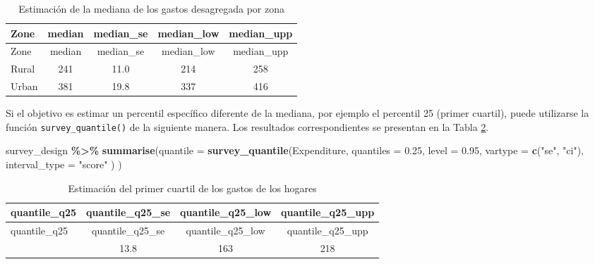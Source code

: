 \documentclass[
  spanish,
  12pt,
]{book}
\newenvironment{Shaded}{\begin{snugshade}}{\end{snugshade}}
\newcommand{\AttributeTok}[1]{\textcolor[rgb]{0.13,0.29,0.53}{#1}}
\newcommand{\FloatTok}[1]{\textcolor[rgb]{0.00,0.00,0.81}{#1}}
\newcommand{\FunctionTok}[1]{\textcolor[rgb]{0.13,0.29,0.53}{\textbf{#1}}}
\newcommand{\NormalTok}[1]{#1}
\newcommand{\SpecialCharTok}[1]{\textcolor[rgb]{0.81,0.36,0.00}{\textbf{#1}}}
\newcommand{\StringTok}[1]{\textcolor[rgb]{0.31,0.60,0.02}{#1}}
\begin{document}
\begin{longtable}[]{@{}lcccc@{}}
\caption{\label{tab:tab-mediana-gasto-zona}Estimación de la mediana de los gastos desagregada por zona}\tabularnewline
\toprule\noalign{}
Zone & median & median\_se & median\_low & median\_upp \\
\midrule\noalign{}
\endfirsthead
\toprule\noalign{}
Zone & median & median\_se & median\_low & median\_upp \\
\midrule\noalign{}
\endhead
\bottomrule\noalign{}
\endlastfoot
Rural & 241 & 11.0 & 214 & 258 \\
Urban & 381 & 19.8 & 337 & 416 \\
\end{longtable}

Si el objetivo es estimar un percentil específico diferente de la mediana, por ejemplo el percentil 25 (primer cuartil), puede utilizarse la función \texttt{survey\_quantile()} de la siguiente manera. Los resultados correspondientes se presentan en la Tabla \ref{tab:tab-cuantil-gasto}.

\begin{Shaded}
\begin{Highlighting}[]
\NormalTok{survey\_design }\SpecialCharTok{\%\textgreater{}\%}
  \FunctionTok{summarise}\NormalTok{(}\AttributeTok{quantile =} \FunctionTok{survey\_quantile}\NormalTok{(Expenditure,}
                                \AttributeTok{quantiles =} \FloatTok{0.25}\NormalTok{,}
                                \AttributeTok{level =} \FloatTok{0.95}\NormalTok{,}
                                \AttributeTok{vartype =} \FunctionTok{c}\NormalTok{(}\StringTok{"se"}\NormalTok{, }\StringTok{"ci"}\NormalTok{),}
                                \AttributeTok{interval\_type =} \StringTok{"score"}
\NormalTok{                                )}
\NormalTok{            )}
\end{Highlighting}
\end{Shaded}

\begin{longtable}[]{@{}lccc@{}}
\caption{\label{tab:tab-cuantil-gasto}Estimación del primer cuartil de los gastos de los hogares}\tabularnewline
\toprule\noalign{}
quantile\_q25 & quantile\_q25\_se & quantile\_q25\_low & quantile\_q25\_upp \\
\midrule\noalign{}
\endfirsthead
\toprule\noalign{}
quantile\_q25 & quantile\_q25\_se & quantile\_q25\_low & quantile\_q25\_upp \\
\midrule\noalign{}
\endhead
\bottomrule\noalign{}
\endlastfoot
200 & 13.8 & 163 & 218 \\
\end{longtable}
\end{document}

